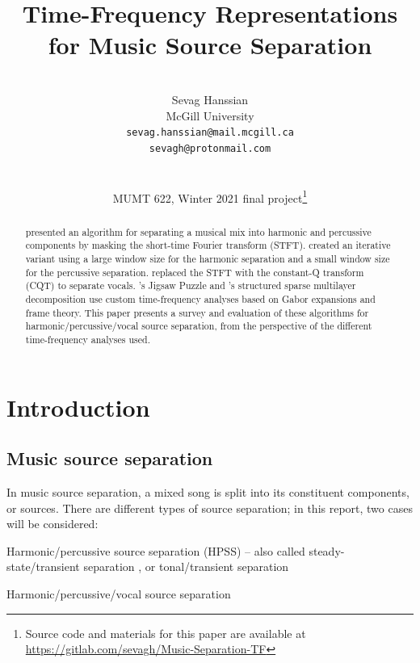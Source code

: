 \documentclass[letter,12pt]{article}
\title{Time-Frequency Representations for Music Source Separation}
\author{\vspace{2em}\\Sevag Hanssian \\
  McGill University \\
 \texttt{sevag.hanssian@mail.mcgill.ca} \\
 \texttt{sevagh@protonmail.com} \\\ \\\ \\
 MUMT 622, Winter 2021 final project\thanks{Source code and materials for this paper are available at \url{https://gitlab.com/sevagh/Music-Separation-TF}}}
\date{}
\newenvironment{tight_enumerate}{
\begin{enumerate}
  \setlength{\itemsep}{0pt}
  \setlength{\parskip}{0pt}
}{\end{enumerate}}
\begin{document}
\maketitle

\vfill
\clearpage %

\tableofcontents

\vfill
\clearpage %

\listoffigures

\listoflistings

\vfill
\clearpage %



\begin{abstract}
	\citet{fitzgerald1} presented an algorithm for separating a musical mix into harmonic and percussive components by masking the short-time Fourier transform (STFT). \citet{driedger} created an iterative variant using a large window size for the harmonic separation and a small window size for the percussive separation. \citet{fitzgerald2} replaced the STFT with the constant-Q transform (CQT) to separate vocals. \citet{tfjigsaw}'s Jigsaw Puzzle and \citet{wmdct}'s structured sparse multilayer decomposition use custom time-frequency analyses based on Gabor expansions and frame theory. This paper presents a survey and evaluation of these algorithms for harmonic/percussive/vocal source separation, from the perspective of the different time-frequency analyses used.
\end{abstract}

\section{Introduction}
\label{sec:intro}

\subsection{Music source separation}

In music source separation, a mixed song is split into its constituent components, or sources. There are different types of source separation; in this report, two cases will be considered:

\begin{tight_enumerate}
	\item
		Harmonic/percussive source separation (HPSS) -- also called steady-state/transient separation \cite{bayarres}, or tonal/transient separation \cite{tfjigsaw, wmdct}
	\item
		Harmonic/percussive/vocal source separation
\end{tight_enumerate}
\end{document}
